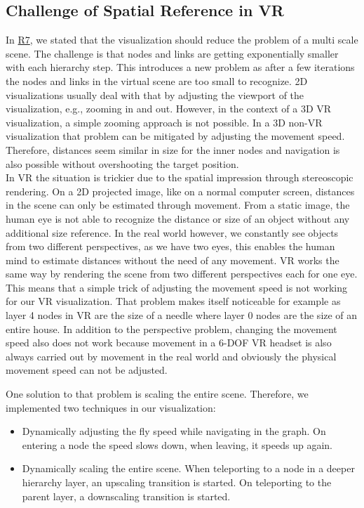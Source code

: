 \subsection{Challenge of Spatial Reference in VR}
\label{chap:ps-spatialReference}
In \hyperref[req:R7]{R7}, we stated that the visualization should reduce the problem of a multi scale scene.
The challenge is that nodes and links are getting exponentially smaller with each hierarchy step.
This introduces a new problem as after a few iterations the nodes and links in the virtual scene are too small to recognize.
2D visualizations usually deal with that by adjusting the viewport of the visualization, e.g., zooming in and out. 
However, in the context of a 3D VR visualization, a simple zooming approach is not possible. 
In a 3D non-VR visualization that problem can be mitigated by adjusting the movement speed. Therefore, distances seem similar in size for the inner nodes and navigation is also possible without overshooting the target position.\\ 
In VR the situation is trickier due to the spatial impression through stereoscopic rendering. On a 2D projected image, like on a normal computer screen, distances in the scene can only be estimated through movement. From a static image, the human eye is not able to recognize the distance or size of an object without any additional size reference. 
In the real world however, we constantly see objects from two different perspectives, as we have two eyes, this enables the human mind to estimate distances without the need of any movement. VR works the same way by rendering the scene from two different perspectives each for one eye.  
This means that a simple trick of adjusting the movement speed is not working for our VR visualization.
That problem makes itself noticeable for example as layer 4 nodes in VR are the size of a needle where layer 0 nodes are the size of an entire house.
In addition to the perspective problem, changing the movement speed also does not work because movement in a 6-DOF VR headset is also always carried out by movement in the real world and obviously the physical movement speed can not be adjusted.
\pagebreak

One solution to that problem is scaling the entire scene. Therefore, we implemented two techniques in our visualization:
\begin{itemize}
    \item Dynamically adjusting the fly speed while navigating in the graph. On entering a node the speed slows down, when leaving, it speeds up again. 
    \item Dynamically scaling the entire scene. When teleporting to a node in a deeper hierarchy layer, an upscaling transition is started. On teleporting to the parent layer, a downscaling transition is started. 
\end{itemize} 

